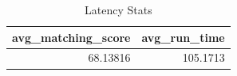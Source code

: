 \begin{table}

\caption{Latency Stats}
\centering
\begin{tabular}[t]{rr}
\toprule
avg\_matching\_score & avg\_run\_time\\
\midrule
68.13816 & 105.1713\\
\bottomrule
\end{tabular}
\end{table}
